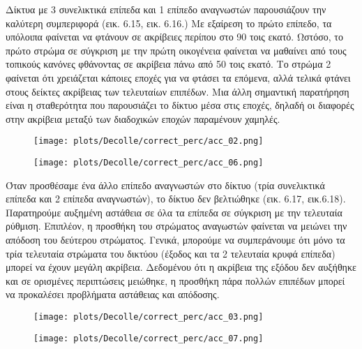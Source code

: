 \documentclass[12pt]{report}
\begin{document}
Δίκτυα με 3 συνελικτικά επίπεδα και 1 επίπεδο αναγνωστών παρουσιάζουν την καλύτερη συμπεριφορά (εικ. 6.15, εικ. 6.16.) Με εξαίρεση το πρώτο επίπεδο, τα υπόλοιπα φαίνεται να φτάνουν σε ακρίβειες περίπου στο 90 τοις εκατό. Ωστόσο, το πρώτο στρώμα σε σύγκριση με την πρώτη οικογένεια φαίνεται να μαθαίνει από τους τοπικούς κανόνες φθάνοντας σε ακρίβεια πάνω από 50 τοις εκατό. Το στρώμα 2 φαίνεται ότι χρειάζεται κάποιες εποχές για να φτάσει τα επόμενα, αλλά τελικά φτάνει στους δείκτες ακρίβειας των τελευταίων επιπέδων. Μια άλλη σημαντική παρατήρηση είναι η σταθερότητα που παρουσιάζει το δίκτυο μέσα στις εποχές, δηλαδή οι διαφορές στην ακρίβεια μεταξύ των διαδοχικών εποχών παραμένουν χαμηλές.
\begin{figure}
\centering
\begin{minipage}{.4\textwidth}
  \centering
  \texttt{[image: plots/Decolle/correct\_perc/acc\_02.png]}
  \label{fig:test1}
\end{minipage}
\begin{minipage}{.4\textwidth}
  \centering
  \texttt{[image: plots/Decolle/correct\_perc/acc\_06.png]}
  \label{fig:test2}
\end{minipage}
\end{figure}

Όταν προσθέσαμε ένα άλλο επίπεδο αναγνωστών στο δίκτυο (τρία συνελικτικά επίπεδα και 2 επίπεδα αναγνωστών), το δίκτυο δεν βελτιώθηκε (εικ. 6.17, εικ.6.18). Παρατηρούμε αυξημένη αστάθεια σε όλα τα επίπεδα σε σύγκριση με την τελευταία ρύθμιση. Επιπλέον, η προσθήκη του στρώματος αναγωστών φαίνεται να μειώνει την απόδοση του δεύτερου στρώματος. Γενικά, μπορούμε να συμπεράνουμε ότι μόνο τα τρία τελευταία στρώματα του δικτύου (έξοδος και τα 2 τελευταία κρυφά επίπεδα) μπορεί να έχουν μεγάλη ακρίβεια. Δεδομένου ότι η ακρίβεια της εξόδου δεν αυξήθηκε και σε ορισμένες περιπτώσεις μειώθηκε, η προσθήκη πάρα πολλών επιπέδων μπορεί να προκαλέσει προβλήματα αστάθειας και απόδοσης.

\begin{figure}
\centering
\begin{minipage}{.4\textwidth}
  \centering
  \texttt{[image: plots/Decolle/correct\_perc/acc\_03.png]}
  \label{fig:test1}
\end{minipage}
\begin{minipage}{.4\textwidth}
  \centering
  \texttt{[image: plots/Decolle/correct\_perc/acc\_07.png]}
  \label{fig:test2}
\end{minipage}
\end{figure}
\end{document}
